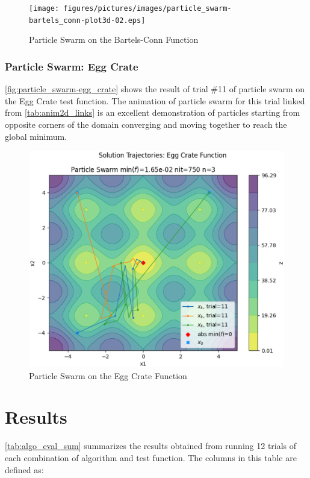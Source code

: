 \documentclass{vgtc}                          %
\begin{document}
\begin{figure}[tb]
\centering
\texttt{[image: figures/pictures/images/particle\_swarm-bartels\_conn-plot3d-02.eps]}
\caption{Particle Swarm on the Bartels-Conn Function}
\label{fig:particle_swarm-bartels_conn}
\end{figure}

\subsubsection{Particle Swarm: Egg Crate}

\autoref{fig:particle_swarm-egg_crate} shows the result of trial \#11 of particle swarm on the Egg Crate test function. The animation of particle swarm for this trial linked from \autoref{tab:anim2d_links} is an excellent demonstration of particles starting from opposite corners of the domain converging and moving together to reach the global minimum.

\begin{figure}[tb]
\centering
\includegraphics[width=\columnwidth]{figures/pictures/images/particle_swarm-egg_crate-plot2d-11.eps}
\caption{Particle Swarm on the Egg Crate Function}
\label{fig:particle_swarm-egg_crate}
\end{figure}

\section{Results}

\autoref{tab:algo_eval_sum} summarizes the results obtained from running 12 trials of each combination of algorithm and test function. The columns in this table are defined as:
\end{document}
